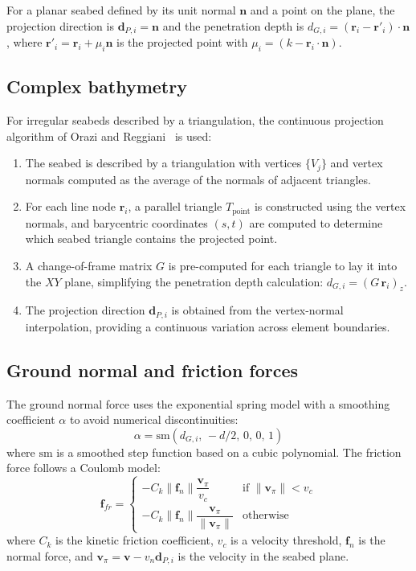\documentclass[11pt]{article}
\begin{document}
For a planar seabed defined by its unit normal $\mathbf{n}$ and a point on the plane, the projection direction is $\mathbf{d}_{P,i} = \mathbf{n}$ and the penetration depth is $d_{G,i} = (\mathbf{r}_i - \mathbf{r}'_i)\cdot\mathbf{n}$, where $\mathbf{r}'_i = \mathbf{r}_i + \mu_i\mathbf{n}$ is the projected point with $\mu_i = (k - \mathbf{r}_i\cdot\mathbf{n})$.

\subsection{Complex bathymetry}

For irregular seabeds described by a triangulation, the continuous projection algorithm of Orazi and Reggiani~\cite{Orazi-2020} is used:
\begin{enumerate}
    \item The seabed is described by a triangulation with vertices $\{V_j\}$ and vertex normals computed as the average of the normals of adjacent triangles.
    \item For each line node $\mathbf{r}_i$, a parallel triangle $T_{\text{point}}$ is constructed using the vertex normals, and barycentric coordinates $(s,t)$ are computed to determine which seabed triangle contains the projected point.
    \item A change-of-frame matrix $G$ is pre-computed for each triangle to lay it into the $XY$ plane, simplifying the penetration depth calculation: $d_{G,i} = (G\,\mathbf{r}_i)_z$.
    \item The projection direction $\mathbf{d}_{P,i}$ is obtained from the vertex-normal interpolation, providing a continuous variation across element boundaries.
\end{enumerate}

\subsection{Ground normal and friction forces}

The ground normal force uses the exponential spring model with a smoothing coefficient $\alpha$ to avoid numerical discontinuities:
\begin{equation}
\alpha = \text{sm}(d_{G,i},\, -d/2,\, 0,\, 0,\, 1)
\end{equation}
where $\text{sm}$ is a smoothed step function based on a cubic polynomial. The friction force follows a Coulomb model:
\begin{equation}
\mathbf{f}_{fr} = \begin{cases}
-C_k\|\mathbf{f}_n\|\dfrac{\mathbf{v}_\pi}{v_c} & \text{if } \|\mathbf{v}_\pi\| < v_c \\[6pt]
-C_k\|\mathbf{f}_n\|\dfrac{\mathbf{v}_\pi}{\|\mathbf{v}_\pi\|} & \text{otherwise}
\end{cases}
\end{equation}
where $C_k$ is the kinetic friction coefficient, $v_c$ is a velocity threshold, $\mathbf{f}_n$ is the normal force, and $\mathbf{v}_\pi = \mathbf{v} - v_n\mathbf{d}_{P,i}$ is the velocity in the seabed plane.
\end{document}
